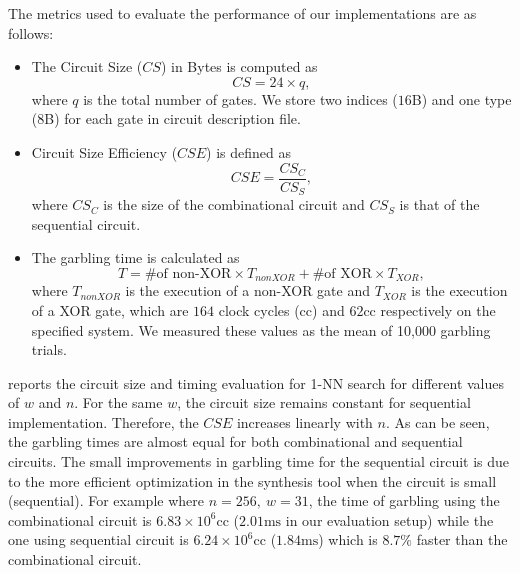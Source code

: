 The metrics used to evaluate the performance of our implementations are as follows:
\begin{itemize}
  \item The Circuit Size ($\mathit{CS}$) in Bytes is computed as $$\mathit{CS} = 24\times q, $$ where $q$ is the total number of gates.
  We store two indices ($16$B) and one type ($8$B) for each gate in circuit description file.

  \item Circuit Size Efficiency ($\mathit{CSE}$) is defined as $$\mathit{CSE} = \dfrac{\mathit{CS}_{C}}{\mathit{CS}_{S}}, $$ where $\mathit{CS}_{C}$ is the size of the combinational circuit and $\mathit{CS}_{S}$ is that of the sequential circuit.

  \item The garbling time is calculated as $$\mathit{T} = \text{\# of non-XOR} \times \mathit{T_{nonXOR}} + \text{\# of XOR} \times \mathit{T_\text{XOR}},$$ where $\mathit{T_{nonXOR}}$ is the execution of a non-XOR gate and $\mathit{T_\text{XOR}}$ is the execution of a XOR gate, which are $164$ clock cycles (cc) and $62$cc respectively on the specified system.
  We measured these values as the mean of 10,000 garbling trials.
\end{itemize}

 reports the circuit size and timing evaluation for 1-NN search for different values of $w$ and $n$.
For the same $w$, the circuit size remains constant for sequential implementation.
Therefore, the $\mathit{CSE}$ increases linearly with $n$.
As can be seen, the garbling times are almost equal for both combinational and sequential circuits.
The small improvements in garbling time for the sequential circuit is due to the more efficient optimization in the synthesis tool when the circuit is small (sequential).
For example where $n=256,~w=31$, the time of garbling using the combinational circuit is $6.83\times 10^6\text{cc}$ ($2.01\text{ms}$ in our evaluation setup) while the one using sequential circuit is $6.24\times 10^6\text{cc}$ ($1.84\text{ms}$) which is $8.7\%$ faster than the combinational circuit.

